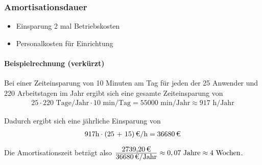 \subsubsection{Amortisationsdauer}
\label{sec:Amortisationsdauer}
\begin{itemize}
	\item Einsparung 2 mal Betriebskosten
	\item Personalkosten für Einrichtung
\end{itemize}

\paragraph{Beispielrechnung (verkürzt)}
Bei einer Zeiteinsparung von 10 Minuten am Tag für jeden der 25 Anwender und 220 Arbeitstagen im Jahr ergibt sich eine gesamte Zeiteinsparung von 
\begin{eqnarray}
25 \cdot 220 \mbox{ Tage/Jahr} \cdot 10 \mbox{ min/Tag} = 55000 \mbox{ min/Jahr} \approx 917 \mbox{ h/Jahr} 
\end{eqnarray}

Dadurch ergibt sich eine jährliche Einsparung von 
\begin{eqnarray}
917 \mbox{h} \cdot \eur{(25 + 15)}{\mbox{/h}} = \eur{36680}
\end{eqnarray}

Die Amortisationszeit beträgt also $\frac{\eur{2739,20}}{\eur{36680}\mbox{/Jahr}} \approx 0,07 \mbox{ Jahre} \approx 4 \mbox{ Wochen}$.